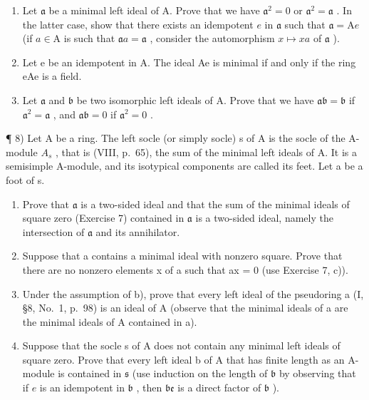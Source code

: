 \begin{enumerate}
\def\labelenumi{\alph{enumi})}
\item
  Let \(\mathfrak{a}\) be a minimal left ideal of A. Prove that we have \(\mathfrak{a}^2 = 0\) or \(\mathfrak{a}^2 = \mathfrak{a}\) . In the latter case, show that there exists an idempotent \(e\) in \(\mathfrak{a}\) such that \(\mathfrak{a} = \mathrm{A}e\) (if \(a \in \mathrm{A}\) is such that \(\mathfrak{a}a = \mathfrak{a}\) , consider the automorphism \(x \mapsto xa\) of \(\mathfrak{a}\) ).
\item
  Let e be an idempotent in A. The ideal Ae is minimal if and only if the ring eAe is a field.
\item
  Let \(\mathfrak{a}\) and \(\mathfrak{b}\) be two isomorphic left ideals of A. Prove that we have \(\mathfrak{ab} = \mathfrak{b}\) if \(\mathfrak{a}^2 = \mathfrak{a}\) , and \(\mathfrak{ab} = 0\) if \(\mathfrak{a}^2 = 0\) .
\end{enumerate}

¶ 8) Let A be a ring. The left socle (or simply socle) s of A is the socle of the A-module \(A_{s}\) , that is (VIII, p.~65), the sum of the minimal left ideals of A. It is a semisimple A-module, and its isotypical components are called its feet. Let a be a foot of s.

\begin{enumerate}
\def\labelenumi{\alph{enumi})}
\item
  Prove that \(\mathfrak{a}\) is a two-sided ideal and that the sum of the minimal ideals of square zero (Exercise 7) contained in \(\mathfrak{a}\) is a two-sided ideal, namely the intersection of \(\mathfrak{a}\) and its annihilator.
\item
  Suppose that a contains a minimal ideal with nonzero square. Prove that there are no nonzero elements x of a such that ax = 0 (use Exercise 7, c)).
\item
  Under the assumption of b), prove that every left ideal of the pseudoring a (I, §8, No.~1, p.~98) is an ideal of A (observe that the minimal ideals of a are the minimal ideals of A contained in a).
\item
  Suppose that the socle s of A does not contain any minimal left ideals of square zero. Prove that every left ideal b of A that has finite length as an A-module is contained in \(\mathfrak{s}\) (use induction on the length of \(\mathfrak{b}\) by observing that if \(e\) is an idempotent in \(\mathfrak{b}\) , then \(\mathfrak{be}\) is a direct factor of \(\mathfrak{b}\) ).
\end{enumerate}

